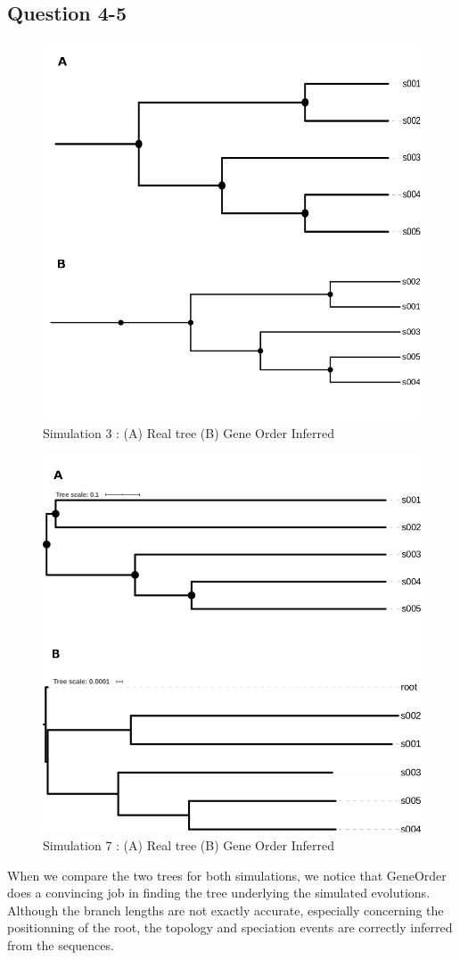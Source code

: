 \documentclass[]{article}
\theoremstyle{definition}
\begin{document}
\newpage
\subsection{Question 4-5}

\begin{figure}[h]
	\centering
	\includegraphics*[width = 0.5\linewidth]{image/new/tree3.png}
	\caption{ Simulation 3 :  (A) Real tree (B) Gene Order Inferred }
\end{figure}

\begin{figure}[h]
	\centering
	\includegraphics*[width = 0.5\linewidth]{image/new/tree7.png}
	\caption{ Simulation 7 :  (A) Real tree (B) Gene Order Inferred }
\end{figure}

When we compare the two trees for both simulations, we notice that GeneOrder does a convincing job in finding the tree underlying the simulated evolutions. Although the branch lengths are not exactly accurate, especially concerning the positionning of the root, the topology and speciation events are correctly inferred from the sequences.
\end{document}
